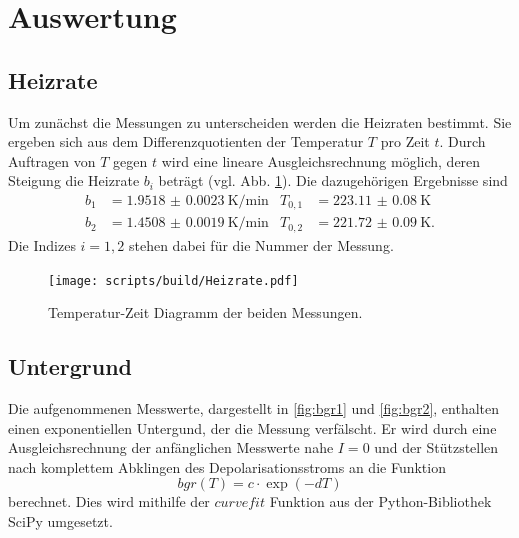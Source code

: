\section{Auswertung}
\label{sec:Auswertung}

\subsection{Heizrate}

Um zunächst die Messungen zu unterscheiden werden die Heizraten bestimmt. Sie ergeben sich aus dem Differenzquotienten der Temperatur $T$ pro Zeit $t$.
Durch Auftragen von $T$ gegen $t$ wird eine lineare Ausgleichsrechnung möglich, deren Steigung die Heizrate $b_i$ beträgt (vgl. Abb. \ref{fig:heiz}).
Die dazugehörigen Ergebnisse sind
\begin{align}
    b_1 &= \qty{1.9518(23)}{\kelvin\per\minute} & T_{0,1} &= \qty{223.11(8)}{\kelvin} \\
    b_2 &= \qty{1.4508(19)}{\kelvin\per\minute} & T_{0,2} &= \qty{221.72(9)}{\kelvin}.
\end{align}
Die Indizes $i = 1,2$ stehen dabei für die Nummer der Messung.

\begin{figure}
    \centering
    \texttt{[image: scripts/build/Heizrate.pdf]}
    \caption{Temperatur-Zeit Diagramm der beiden Messungen.}
    \label{fig:heiz}
\end{figure}

\subsection{Untergrund}
Die aufgenommenen Messwerte, dargestellt in \autoref{fig:bgr1} und \autoref{fig:bgr2}, enthalten einen exponentiellen Untergund, der die Messung verfälscht.
Er wird durch eine Ausgleichsrechnung der anfänglichen Messwerte nahe $I=0$ und der Stützstellen nach komplettem Abklingen des Depolarisationsstroms
an die Funktion
\begin{equation}
    bgr(T) = c \cdot \exp(-dT)
\end{equation}
berechnet. Dies wird mithilfe der $curve fit$ Funktion aus der Python-Bibliothek SciPy\cite{scipy} umgesetzt. 

